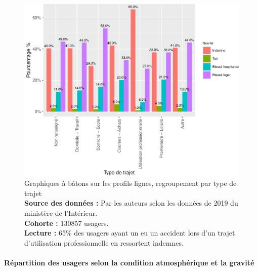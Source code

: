 \documentclass[french,]{tp}
\let\oldparagraph\paragraph
\renewcommand{\paragraph}[1]{\oldparagraph{#1}\mbox{}}
\begin{document}
\begin{figure}[ht!]

{\centering \includegraphics{Prediction_Gravite_files/figure-latex/barplottrajet-1} 

}

\caption{Graphiques à bâtons sur les profils lignes, regroupement par type de trajet\\
\textbf{Source des données :} Par les auteurs selon les données de 2019 du ministère de l'Intérieur.\\
\textbf{Cohorte :} 130857 usagers.\\
\textbf{Lecture :} 65\% des usagers ayant un eu un accident lors d'un trajet d'utilisation professionnelle en ressortent indemnes.}\label{fig:barplottrajet}
\end{figure}

\newpage

\hypertarget{ruxe9partition-des-usagers-selon-la-condition-atmosphuxe9rique-et-la-gravituxe9}{%
\paragraph{Répartition des usagers selon la condition atmosphérique et la gravité}\label{ruxe9partition-des-usagers-selon-la-condition-atmosphuxe9rique-et-la-gravituxe9}}
\end{document}
